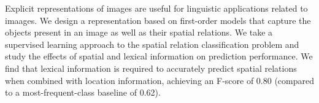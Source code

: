 Explicit representations of images are useful for linguistic applications related to imaages. We design a representation based on first-order models that capture the objects present in an image as well as their spatial relations. We take a supervised learning approach to the spatial relation classification problem and study the effects of spatial and lexical information on prediction performance. We find that lexical information is required to accurately predict spatial relations when combined with location information, achieving an F-score of 0.80 (compared to a most-frequent-class baseline of 0.62).
